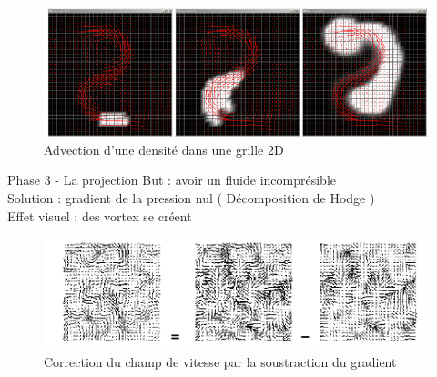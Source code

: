 \documentclass{beamer}
\begin{document}
\begin{frame}{}
  \begin{figure}[h]
    \centering\includegraphics[scale=0.4]{Stam4.png}
    \caption{Advection d'une densité dans une grille 2D}
    \label{Bla}
  \end{figure}
\end{frame}



\begin{frame}{Phase 3 - La projection}
    But : avoir un fluide incomprésible\\
    Solution : gradient de la pression nul ( Décomposition de Hodge )\\
    Effet visuel : des vortex se créent\\
  \begin{figure}[h]
    \centering\includegraphics[scale=0.3]{STAM3.png}
    \caption{Correction du champ de vitesse par la soustraction du gradient}
    \label{ProjectionStam}
  \end{figure}
\end{frame}
\end{document}
